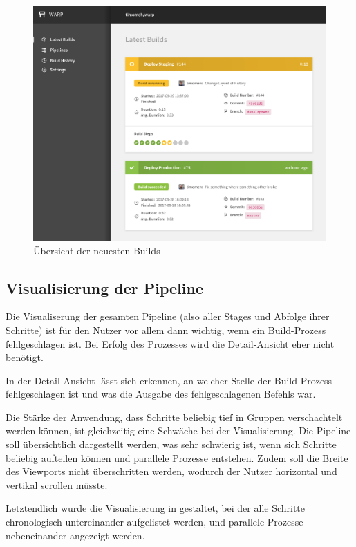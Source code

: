 \begin{figure}[H]
  \caption{Übersicht der neuesten Builds}
  \label{fig:latest-builds}
  \centering
    \includegraphics[width=\textwidth]{assets/latest-builds}
\end{figure}

\subsection{Visualisierung der Pipeline}

Die Visualiserung der gesamten Pipeline (also aller Stages und Abfolge ihrer Schritte) ist für den Nutzer vor allem dann wichtig, wenn ein Build-Prozess fehlgeschlagen ist. Bei Erfolg des Prozesses wird die Detail-Ansicht eher nicht benötigt.

In der Detail-Ansicht lässt sich erkennen, an welcher Stelle der Build-Prozess fehlgeschlagen ist und was die Ausgabe des fehlgeschlagenen Befehls war.

Die Stärke der Anwendung, dass Schritte beliebig tief in Gruppen verschachtelt werden können, ist gleichzeitig eine Schwäche bei der Visualisierung. Die Pipeline soll übersichtlich dargestellt werden, was sehr schwierig ist, wenn sich Schritte beliebig aufteilen können und parallele Prozesse entstehen. Zudem soll die Breite des Viewports nicht überschritten werden, wodurch der Nutzer horizontal und vertikal scrollen müsste.

Letztendlich wurde die Visualisierung in  gestaltet, bei der alle Schritte chronologisch untereinander aufgelistet werden, und parallele Prozesse nebeneinander angezeigt werden.

